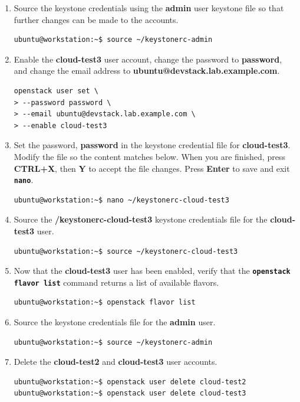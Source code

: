\documentclass[letterpaper, 12pt]{article}
\begin{document}
\begin{enumerate}
    \item Source the keystone credentials using the \textbf{admin} user keystone file so that further changes can be
    made to the accounts.

\begin{lstlisting}
ubuntu@workstation:~$ source ~/keystonerc-admin
\end{lstlisting}

    \item Enable the \textbf{cloud-test3} user account, change the password to \textbf{password}, and change the email
    address to \textbf{ubuntu@devstack.lab.example.com}.    
\begin{lstlisting}
openstack user set \
> --password password \
> --email ubuntu@devstack.lab.example.com \
> --enable cloud-test3
\end{lstlisting}

    \item Set the password, \textbf{password} in the keystone credential file for \textbf{cloud-test3}. Modify the file
    so the content matches below. When you are finished, press \textbf{CTRL+X}, then \textbf{Y} to accept the file
    changes. Press \textbf{Enter} to save and exit \textbf{\texttt{nano}}.
\begin{lstlisting}
ubuntu@workstation:~$ nano ~/keystonerc-cloud-test3
\end{lstlisting}

    \item Source the \textbf{\texttildemid/keystonerc-cloud-test3} keystone credentials file for the
    \textbf{cloud-test3} user.
\begin{lstlisting}
ubuntu@workstation:~$ source ~/keystonerc-cloud-test3
\end{lstlisting}

    \item Now that the \textbf{cloud-test3} user has been enabled, verify that the \textbf{\texttt{openstack flavor
    list}} command returns a list of available flavors.
\begin{lstlisting}
ubuntu@workstation:~$ openstack flavor list
\end{lstlisting}

    \item Source the keystone credentials file for the \textbf{admin} user.
\begin{lstlisting}
ubuntu@workstation:~$ source ~/keystonerc-admin
\end{lstlisting}

    \item Delete the \textbf{cloud-test2} and \textbf{cloud-test3} user accounts.
\begin{lstlisting}
ubuntu@workstation:~$ openstack user delete cloud-test2
ubuntu@workstation:~$ openstack user delete cloud-test3
\end{lstlisting}


\end{enumerate}
\end{document}
